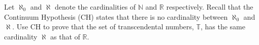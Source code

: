 \begin{exercise}
  \label{ex:hw01:transcendental-cardinality}
  Let $\aleph_0$ and $\aleph$ denote the cardinalities of $\mathbb{N}$ and
  $\mathbb{R}$ respectively. Recall that the Continuum Hypothesis (CH)
  states that there is no cardinality between $\aleph_0$ and $\aleph$.
  Use CH to prove that the set of transcendental numbers, $\mathbb{T}$,
  has the same cardinality $\aleph$ as that of $\mathbb{R}$.
\end{exercise}

